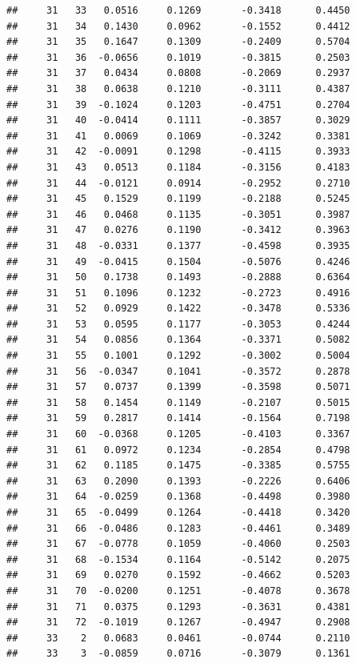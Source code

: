 \documentclass[
]{article}
\begin{document}
\begin{verbatim}
##     31   33   0.0516     0.1269       -0.3418      0.4450  
##     31   34   0.1430     0.0962       -0.1552      0.4412  
##     31   35   0.1647     0.1309       -0.2409      0.5704  
##     31   36  -0.0656     0.1019       -0.3815      0.2503  
##     31   37   0.0434     0.0808       -0.2069      0.2937  
##     31   38   0.0638     0.1210       -0.3111      0.4387  
##     31   39  -0.1024     0.1203       -0.4751      0.2704  
##     31   40  -0.0414     0.1111       -0.3857      0.3029  
##     31   41   0.0069     0.1069       -0.3242      0.3381  
##     31   42  -0.0091     0.1298       -0.4115      0.3933  
##     31   43   0.0513     0.1184       -0.3156      0.4183  
##     31   44  -0.0121     0.0914       -0.2952      0.2710  
##     31   45   0.1529     0.1199       -0.2188      0.5245  
##     31   46   0.0468     0.1135       -0.3051      0.3987  
##     31   47   0.0276     0.1190       -0.3412      0.3963  
##     31   48  -0.0331     0.1377       -0.4598      0.3935  
##     31   49  -0.0415     0.1504       -0.5076      0.4246  
##     31   50   0.1738     0.1493       -0.2888      0.6364  
##     31   51   0.1096     0.1232       -0.2723      0.4916  
##     31   52   0.0929     0.1422       -0.3478      0.5336  
##     31   53   0.0595     0.1177       -0.3053      0.4244  
##     31   54   0.0856     0.1364       -0.3371      0.5082  
##     31   55   0.1001     0.1292       -0.3002      0.5004  
##     31   56  -0.0347     0.1041       -0.3572      0.2878  
##     31   57   0.0737     0.1399       -0.3598      0.5071  
##     31   58   0.1454     0.1149       -0.2107      0.5015  
##     31   59   0.2817     0.1414       -0.1564      0.7198  
##     31   60  -0.0368     0.1205       -0.4103      0.3367  
##     31   61   0.0972     0.1234       -0.2854      0.4798  
##     31   62   0.1185     0.1475       -0.3385      0.5755  
##     31   63   0.2090     0.1393       -0.2226      0.6406  
##     31   64  -0.0259     0.1368       -0.4498      0.3980  
##     31   65  -0.0499     0.1264       -0.4418      0.3420  
##     31   66  -0.0486     0.1283       -0.4461      0.3489  
##     31   67  -0.0778     0.1059       -0.4060      0.2503  
##     31   68  -0.1534     0.1164       -0.5142      0.2075  
##     31   69   0.0270     0.1592       -0.4662      0.5203  
##     31   70  -0.0200     0.1251       -0.4078      0.3678  
##     31   71   0.0375     0.1293       -0.3631      0.4381  
##     31   72  -0.1019     0.1267       -0.4947      0.2908  
##     33    2   0.0683     0.0461       -0.0744      0.2110  
##     33    3  -0.0859     0.0716       -0.3079      0.1361  

\end{verbatim}
\end{document}
